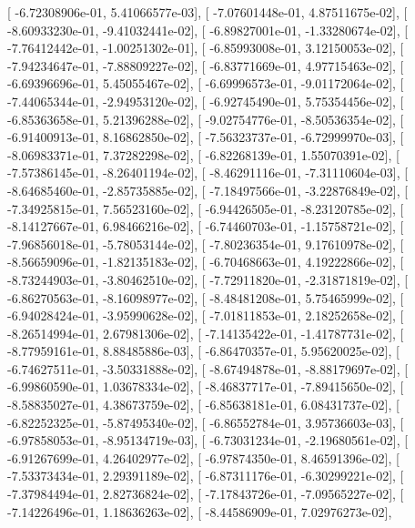 \documentclass{article}
\begin{document}
       [ -6.72308906e-01,   5.41066577e-03],
       [ -7.07601448e-01,   4.87511675e-02],
       [ -8.60933230e-01,  -9.41032441e-02],
       [ -6.89827001e-01,  -1.33280674e-02],
       [ -7.76412442e-01,  -1.00251302e-01],
       [ -6.85993008e-01,   3.12150053e-02],
       [ -7.94234647e-01,  -7.88809227e-02],
       [ -6.83771669e-01,   4.97715463e-02],
       [ -6.69396696e-01,   5.45055467e-02],
       [ -6.69996573e-01,  -9.01172064e-02],
       [ -7.44065344e-01,  -2.94953120e-02],
       [ -6.92745490e-01,   5.75354456e-02],
       [ -6.85363658e-01,   5.21396288e-02],
       [ -9.02754776e-01,  -8.50536354e-02],
       [ -6.91400913e-01,   8.16862850e-02],
       [ -7.56323737e-01,  -6.72999970e-03],
       [ -8.06983371e-01,   7.37282298e-02],
       [ -6.82268139e-01,   1.55070391e-02],
       [ -7.57386145e-01,  -8.26401194e-02],
       [ -8.46291116e-01,  -7.31110604e-03],
       [ -8.64685460e-01,  -2.85735885e-02],
       [ -7.18497566e-01,  -3.22876849e-02],
       [ -7.34925815e-01,   7.56523160e-02],
       [ -6.94426505e-01,  -8.23120785e-02],
       [ -8.14127667e-01,   6.98466216e-02],
       [ -6.74460703e-01,  -1.15758721e-02],
       [ -7.96856018e-01,  -5.78053144e-02],
       [ -7.80236354e-01,   9.17610978e-02],
       [ -8.56659096e-01,  -1.82135183e-02],
       [ -6.70468663e-01,   4.19222866e-02],
       [ -8.73244903e-01,  -3.80462510e-02],
       [ -7.72911820e-01,  -2.31871819e-02],
       [ -6.86270563e-01,  -8.16098977e-02],
       [ -8.48481208e-01,   5.75465999e-02],
       [ -6.94028424e-01,  -3.95990628e-02],
       [ -7.01811853e-01,   2.18252658e-02],
       [ -8.26514994e-01,   2.67981306e-02],
       [ -7.14135422e-01,  -1.41787731e-02],
       [ -8.77959161e-01,   8.88485886e-03],
       [ -6.86470357e-01,   5.95620025e-02],
       [ -6.74627511e-01,  -3.50331888e-02],
       [ -8.67494878e-01,  -8.88179697e-02],
       [ -6.99860590e-01,   1.03678334e-02],
       [ -8.46837717e-01,  -7.89415650e-02],
       [ -8.58835027e-01,   4.38673759e-02],
       [ -6.85638181e-01,   6.08431737e-02],
       [ -6.82252325e-01,  -5.87495340e-02],
       [ -6.86552784e-01,   3.95736603e-03],
       [ -6.97858053e-01,  -8.95134719e-03],
       [ -6.73031234e-01,  -2.19680561e-02],
       [ -6.91267699e-01,   4.26402977e-02],
       [ -6.97874350e-01,   8.46591396e-02],
       [ -7.53373434e-01,   2.29391189e-02],
       [ -6.87311176e-01,  -6.30299221e-02],
       [ -7.37984494e-01,   2.82736824e-02],
       [ -7.17843726e-01,  -7.09565227e-02],
       [ -7.14226496e-01,   1.18636263e-02],
       [ -8.44586909e-01,   7.02976273e-02],
\end{document}
